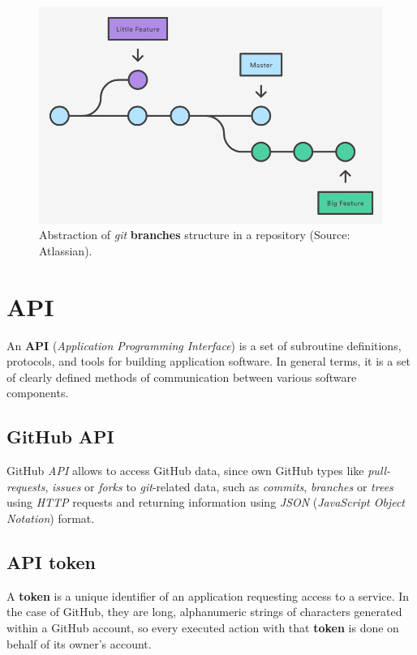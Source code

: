 \documentclass[a4paper, 12pt]{book}
\begin{document}
\begin{figure}
  \centering
  \includegraphics[width=12cm, keepaspectratio]{img/branches-example-atlassian}
  \caption{Abstraction of \emph{git} \textbf{branches} structure in a repository (Source: Atlassian).}
  \label{fig:git-branches-example}
\end{figure}
\section{API}
\label{sec:api}
An \textbf{API} (\textit{Application Programming Interface}) is a set of subroutine definitions, protocols, and tools for building
application software. In general terms, it is a set of clearly defined methods of communication between various software components.
\subsection{GitHub API}
\label{ssec:sec_gh-api}
GitHub \textit{API} allows to access GitHub data, since own GitHub types like \textit{pull-requests}, \textit{issues} or \textit{forks}
to \emph{git}-related data, such as \textit{commits}, \textit{branches} or \textit{trees} using \textit{HTTP} requests and
returning information using \emph{JSON} (\textit{JavaScript Object Notation}) format.
\subsection{API token}
\label{ssec:api-token}
A \textbf{token} is a unique identifier of an application requesting access to a service.
In the case of GitHub, they are long, alphanumeric strings of characters generated within a GitHub account,
so every executed action with that \textbf{token} is done on behalf of its owner's account.
\end{document}
